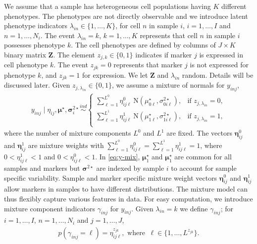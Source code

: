 \documentclass[12pt,]{article}
\newcommand{\N}{ \mathcal{N} }
\newcommand{\ind}{\overset{ind}{\sim}}
\def\bet{\bm{\eta}}
\def\N{\text{N}}
\def\Z{\bm{Z}}
\def\bmu{\bm{\mu}}
\def\bsig{\bm{\sigma}}
\begin{document}


We assume that a sample has heterogeneous cell populations having $K$ different phenotypes.  The phenotypes are not directly observable and we introduce latent phenotype indicators \(\lambda_{in} \in \{1, \ldots, K\}\), for cell $n$ in sample $i$, \(i=1, \ldots, I\) and \(n=1, \ldots, N_i\).
The event $\lambda_{in}=k$, $k=1, \ldots, K$ represents that cell $n$ in sample $i$ possesses phenotype $k$.  The cell phenotypes are defined by columns of \(J \times K\) binary matrix \(\Z\). The element \(z_{j, k} \in \{0, 1\}\) indicates if marker \(j\) is expressed in cell phenotype \(k\). The event \(z_{jk}=0\) represents that marker \(j\) is not expressed for phenotype $k$, and \(z_{jk}=1\) for
expression. We let $\Z$ and $\lambda_{in}$ random. Details will be discussed later.  Given \(z_{j, \lambda_{in}} \in \{0, 1\}\), we assume a mixture of
normals for \(y_{inj}\),
\begin{align}
y_{inj} \mid \eta_{ij}, \bmu^\star, \bsig^{2 \star}_{i} \ind
\begin{cases}
\sum_{\ell=1}^{L^0} \eta^0_{ij\ell}~ \N(\mu^\star_{0\ell}, \sigma^{2 \star}_{0i\ell}), &\mbox{if $z_{j,\lambda_{in}}=0$},\\
\sum_{\ell=1}^{L^1} \eta^1_{ij\ell}~ \N(\mu^\star_{1\ell}, \sigma^{2 \star}_{1i\ell}), &\mbox{if $z_{j,\lambda_{in}}=1$},\\
\end{cases} \label{eq:y-mix}
\end{align}
where the number of mixture components \(L^0\) and \(L^1\) are fixed.  The vectors $\bet^0_{ij}$ and $\bet^1_{ij}$ are mixture weights with \(\sum_{\ell=1}^{L^0} \eta^0_{ij\ell}=\sum_{\ell=1}^{L^1}\eta^1_{ij\ell}=1\), where \(0 < \eta^1_{ij\ell} < 1\) and \(0 < \eta^0_{ij\ell} < 1\).  In \eqref{eq:y-mix}, $\bmu^\star_1$ and $\bmu^\star_1$ are common for all samples and markers but $\bsig^{2\star}$ are indexed by sample $i$ to account for sample specific variability.  Sample and marker specific mixture weight vectors $\bet^0_{ij}$ and $\bet^1_{ij}$ allow markers in samples to have different distributions.   The mixture model can thus flexibly capture various features in data.  For easy computation, we introduce mixture component indicators $\gamma_{inj}$ for $y_{inj}$.  Given \(\lambda_{in}=k\) we define
\(\gamma_{inj}\); for \(i=1, \ldots, I\), \(n=1, \ldots, N_i\) and
\(j=1, \ldots, J\),
\begin{eqnarray}
p(\gamma_{inj} = \ell)=\eta^{z_{jk}}_{ij\ell}, \mbox{ where }~ \ell \in \{1,\ldots, L^{z_{jk}}\}. \label{eq:gam}
\end{eqnarray}
\end{document}
